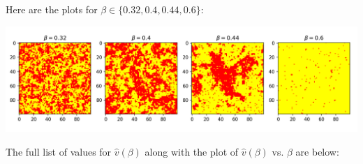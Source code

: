 \documentclass[11pt,letterpaper, leqno]{article}
\numberwithin{equation}{section}
\numberwithin{theorem}{section}
\numberwithin{lemma}{section}
\numberwithin{corollary}{section}
\numberwithin{definition}{section}
\numberwithin{proposition}{section}
\numberwithin{remark}{section}
\numberwithin{example}{section}
\renewcommand{\hat}[1]{\widehat{#1}}
\begin{document}
\color{blue}
        Here are the plots for $\beta \in \{0.32, 0.4, 0.44, 0.6\}$:
        \begin{center}
            \includegraphics[width=\textwidth]{Images/X1000.png}
        \end{center}

        \pagebreak
        The full list of values for $\widehat{v}(\beta)$ along with the plot of $\hat v(\beta)$ vs. $\beta$ are below:

        \vspace*{0.1in}
\end{document}
